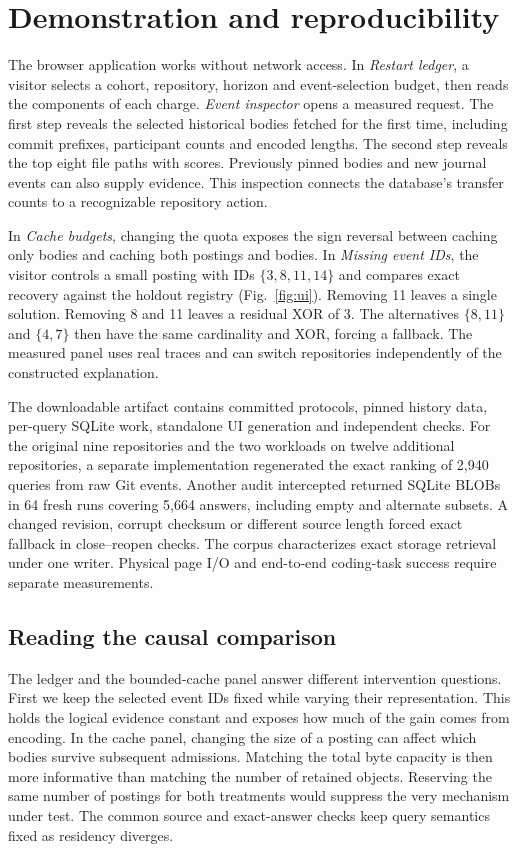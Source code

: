\documentclass[conference]{IEEEtran}
\begin{document}
\section{Demonstration and reproducibility}
The browser application works without network access. In \emph{Restart ledger}, a visitor selects a cohort, repository, horizon and event-selection budget, then reads the components of each charge. \emph{Event inspector} opens a measured request. The first step reveals the selected historical bodies fetched for the first time, including commit prefixes, participant counts and encoded lengths. The second step reveals the top eight file paths with scores. Previously pinned bodies and new journal events can also supply evidence. This inspection connects the database's transfer counts to a recognizable repository action.

In \emph{Cache budgets}, changing the quota exposes the sign reversal between caching only bodies and caching both postings and bodies. In \emph{Missing event IDs}, the visitor controls a small posting with IDs $\{3,8,11,14\}$ and compares exact recovery against the holdout registry (Fig.~\ref{fig:ui}). Removing 11 leaves a single solution. Removing 8 and 11 leaves a residual XOR of 3. The alternatives $\{8,11\}$ and $\{4,7\}$ then have the same cardinality and XOR, forcing a fallback. The measured panel uses real traces and can switch repositories independently of the constructed explanation.

The downloadable artifact contains committed protocols, pinned history data, per-query SQLite work, standalone UI generation and independent checks. For the original nine repositories and the two workloads on twelve additional repositories, a separate implementation regenerated the exact ranking of 2,940 queries from raw Git events. Another audit intercepted returned SQLite BLOBs in 64 fresh runs covering 5,664 answers, including empty and alternate subsets. A changed revision, corrupt checksum or different source length forced exact fallback in close--reopen checks. The corpus characterizes exact storage retrieval under one writer. Physical page I/O and end-to-end coding-task success require separate measurements.

\balance
\subsection{Reading the causal comparison}
The ledger and the bounded-cache panel answer different intervention questions. First we keep the selected event IDs fixed while varying their representation. This holds the logical evidence constant and exposes how much of the gain comes from encoding. In the cache panel, changing the size of a posting can affect which bodies survive subsequent admissions. Matching the total byte capacity is then more informative than matching the number of retained objects. Reserving the same number of postings for both treatments would suppress the very mechanism under test. The common source and exact-answer checks keep query semantics fixed as residency diverges.
\end{document}
